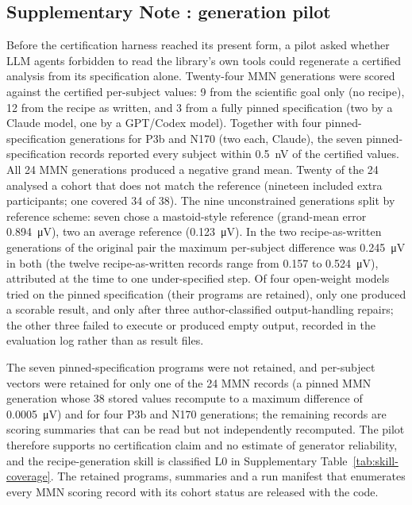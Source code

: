 \subsection*{Supplementary Note \thesuppnote: generation pilot}
\label{si:generation}

Before the certification harness reached its present form, a pilot asked whether LLM agents forbidden to read the library's own tools could regenerate a certified analysis from its specification alone. Twenty-four MMN generations were scored against the certified per-subject values: 9 from the scientific goal only (no recipe), 12 from the recipe as written, and 3 from a fully pinned specification (two by a Claude model, one by a GPT/Codex model). Together with four pinned-specification generations for P3b and N170 (two each, Claude), the seven pinned-specification records reported every subject within \SI{0.5}{nV} of the certified values. All 24 MMN generations produced a negative grand mean. Twenty of the 24 analysed a cohort that does not match the reference (nineteen included extra participants; one covered 34 of 38). The nine unconstrained generations split by reference scheme: seven chose a mastoid-style reference (grand-mean error \SI{0.894}{\uV}), two an average reference (\SI{0.123}{\uV}). In the two recipe-as-written generations of the original pair the maximum per-subject difference was \SI{0.245}{\uV} in both (the twelve recipe-as-written records range from 0.157 to \SI{0.524}{\uV}), attributed at the time to one under-specified step. Of four open-weight models tried on the pinned specification (their programs are retained), only one produced a scorable result, and only after three author-classified output-handling repairs; the other three failed to execute or produced empty output, recorded in the evaluation log rather than as result files.

The seven pinned-specification programs were not retained, and per-subject vectors were retained for only one of the 24 MMN records (a pinned MMN generation whose 38 stored values recompute to a maximum difference of \SI{0.0005}{\uV}) and for four P3b and N170 generations; the remaining records are scoring summaries that can be read but not independently recomputed. The pilot therefore supports no certification claim and no estimate of generator reliability, and the recipe-generation skill is classified L0 in Supplementary Table~\ref*{tab:skill-coverage}. The retained programs, summaries and a run manifest that enumerates every MMN scoring record with its cohort status are released with the code.

\FloatBarrier
{}
